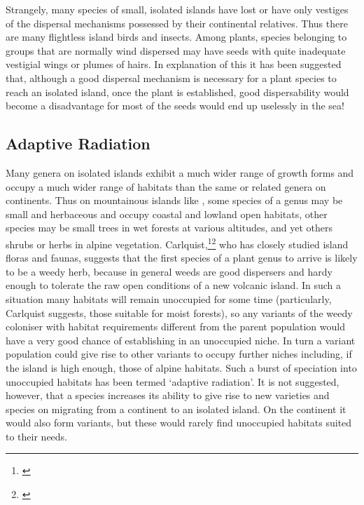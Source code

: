 Strangely, many species of small, isolated islands have lost or have only vestiges of the dispersal mechanisms possessed by their continental relatives.
Thus there are many flightless island birds and insects.
Among plants, species belonging to groups that are normally wind dispersed may have seeds with quite inadequate vestigial wings or plumes of hairs.
In explanation of this it has been suggested that, although a good dispersal mechanism is necessary for a plant species to reach an isolated island, once the plant is established, good dispersability would become a disadvantage for most of the seeds would end up uselessly in the sea!

\subsection{Adaptive Radiation}

Many genera on isolated islands exhibit a much wider range of growth forms and occupy a much wider range of habitats than the same or related genera on continents.
Thus on mountainous islands like , some species of a genus may be small and herbaceous and occupy coastal and lowland open habitats, other species may be small trees in wet forests at various altitudes, and yet others shrubs or herbs in alpine vegetation.
Carlquist,\footnote{\cite{carlquist1970hawaii}}\footnote{\cite{carlquist1965island}} who has closely studied island floras and faunas, suggests that the first species of a plant genus to arrive is likely to be a weedy herb, because in general weeds are good dispersers and hardy enough to tolerate the raw open conditions of a new volcanic island.
In such a situation many habitats will remain unoccupied for some time (particularly, Carlquist suggests, those suitable for moist forests), so any variants of the weedy coloniser with habitat requirements different from the parent population would have a very good chance of establishing in an unoccupied niche.
In turn a variant population could give rise to other variants to occupy further niches including, if the island is high enough, those of alpine habitats.
Such a burst of speciation into unoccupied habitats has been termed `adaptive radiation'.
It is not suggested, however, that a species increases its ability to give rise to new varieties and species on migrating from a continent to an isolated island.
On the continent it would also form variants, but these would rarely find unoccupied habitats suited to their needs.

